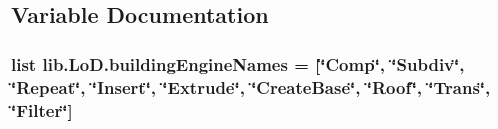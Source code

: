 \subsection{Variable Documentation}
\hypertarget{namespacelib_1_1_lo_d_a6674b6ab1b0b27a927bccba1e548010b}{
\subsubsection[{building\-Engine\-Names}]{\setlength{\rightskip}{0pt plus 5cm}list lib.\-Lo\-D.\-building\-Engine\-Names = \mbox{[}\char`\"{}Comp\char`\"{}, \char`\"{}Subdiv\char`\"{}, \char`\"{}Repeat\char`\"{}, \char`\"{}Insert\char`\"{}, \char`\"{}Extrude\char`\"{}, \char`\"{}Create\-Base\char`\"{}, \char`\"{}Roof\char`\"{}, \char`\"{}Trans\char`\"{}, \char`\"{}Filter\char`\"{}\mbox{]}}}\label{namespacelib_1_1_lo_d_a6674b6ab1b0b27a927bccba1e548010b}
